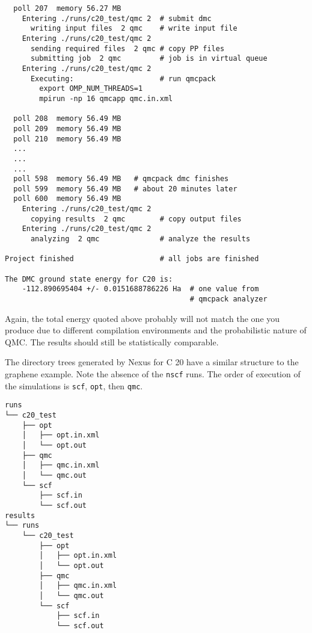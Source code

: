 \documentclass[oneside,11pt]{memoir}
\numberwithin{equation}{section}
\begin{document}
\begin{shaded}
\begin{verbatim}
  poll 207  memory 56.27 MB 
    Entering ./runs/c20_test/qmc 2  # submit dmc
      writing input files  2 qmc    # write input file
    Entering ./runs/c20_test/qmc 2 
      sending required files  2 qmc # copy PP files
      submitting job  2 qmc         # job is in virtual queue
    Entering ./runs/c20_test/qmc 2 
      Executing:                    # run qmcpack
        export OMP_NUM_THREADS=1
        mpirun -np 16 qmcapp qmc.in.xml 

  poll 208  memory 56.49 MB 
  poll 209  memory 56.49 MB 
  poll 210  memory 56.49 MB 
  ...
  ...
  ...
  poll 598  memory 56.49 MB   # qmcpack dmc finishes
  poll 599  memory 56.49 MB   # about 20 minutes later
  poll 600  memory 56.49 MB 
    Entering ./runs/c20_test/qmc 2 
      copying results  2 qmc        # copy output files
    Entering ./runs/c20_test/qmc 2 
      analyzing  2 qmc              # analyze the results

Project finished                    # all jobs are finished
 
The DMC ground state energy for C20 is:
    -112.890695404 +/- 0.0151688786226 Ha  # one value from
                                           # qmcpack analyzer
\end{verbatim}
\end{shaded}

Again, the total energy quoted above probably will not match the one you produce 
due to different compilation environments and the probabilistic nature of 
QMC.  The results should still be statistically comparable.

The directory trees generated by Nexus for C 20 have a similar structure 
to the graphene example.  Note the absence of the \texttt{nscf} runs.  The order 
of execution of the simulations is \texttt{scf}, \texttt{opt}, then \texttt{qmc}.

\begin{shaded}
\begin{verbatim}
runs
└── c20_test
    ├── opt
    │   ├── opt.in.xml
    │   └── opt.out
    ├── qmc
    │   ├── qmc.in.xml
    │   └── qmc.out
    └── scf
        ├── scf.in
        └── scf.out
results
└── runs
    └── c20_test
        ├── opt
        │   ├── opt.in.xml
        │   └── opt.out
        ├── qmc
        │   ├── qmc.in.xml
        │   └── qmc.out
        └── scf
            ├── scf.in
            └── scf.out
\end{verbatim}
\end{shaded}
\end{document}
